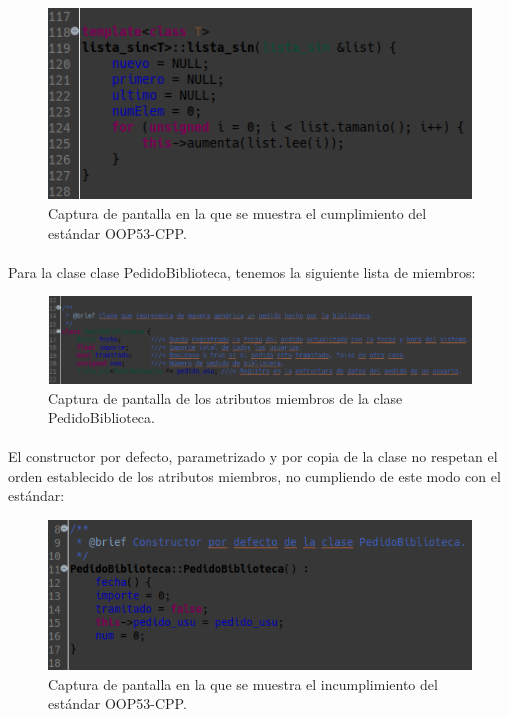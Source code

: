 			\begin{figure}[H]
				\centering
				\includegraphics[scale=0.7]{img/captura19.png}
				\caption{Captura de pantalla en la que se muestra el cumplimiento del estándar OOP53-CPP.}
				\label{captura19}
			\end{figure}
		
			\paragraph{}Para la clase clase PedidoBiblioteca, tenemos la siguiente lista de miembros:
			
			\begin{figure}[H]
				\centering
				\includegraphics[scale=0.5]{img/captura20.png}
				\caption{Captura de pantalla de los atributos miembros de la clase PedidoBiblioteca.}
				\label{captura20}
			\end{figure}
		
			\paragraph{}El constructor por defecto, parametrizado y por copia de la clase no respetan el orden establecido de los atributos miembros, no cumpliendo de este modo con el estándar:
			
			\begin{figure}[H]
				\centering
				\includegraphics[scale=0.7]{img/captura21.png}
				\caption{Captura de pantalla en la que se muestra el incumplimiento del estándar OOP53-CPP.}
				\label{captura21}
			\end{figure}
		
